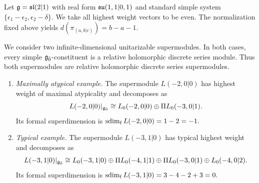 \begin{example}
Let $\gg=\sl(2\vert1)$ with real form $\su(1,1\vert0,1)$ and standard simple system
$\{\epsilon_1-\epsilon_2,\epsilon_2-\delta\}$.
We take all highest weight vectors to be even. The normalization fixed above yields $d(\pi_{(a,b\vert c)})=b-a-1$.

We consider two infinite-dimensional unitarizable supermodules. In both cases, every simple $\even$-constituent is a relative holomorphic discrete series module. Thus both supermodules are relative holomorphic discrete series supermodules.

\begin{enumerate}
\item[(a)] \emph{Maximally atypical example.}
The supermodule $L(-2,0\vert0)$ has highest weight of maximal atypicality and decomposes as
\begin{equation*}
L(-2,0\vert0)|_{\even}
\cong
L_0(-2,0\vert0)\oplus\Pi L_0(-3,0\vert1).
\end{equation*}
Its formal superdimension is
$
\fsdim L(-2,0\vert0)=1-2=-1.
$

\item[(b)] \emph{Typical example.}
The supermodule $L(-3,1\vert0)$ has typical highest weight and decomposes as
\begin{equation*}
\begin{aligned}
L(-3,1\vert0)|_{\even}
\cong{}
L_0(-3,1\vert0)
\oplus\Pi L_0(-4,1\vert1)\oplus\Pi L_0(-3,0\vert1)
\oplus L_0(-4,0\vert2).
\end{aligned}
\end{equation*}
Its formal superdimension is
$
\fsdim L(-3,1\vert0)=3-4-2+3=0.
$
\end{enumerate}
\end{example}

